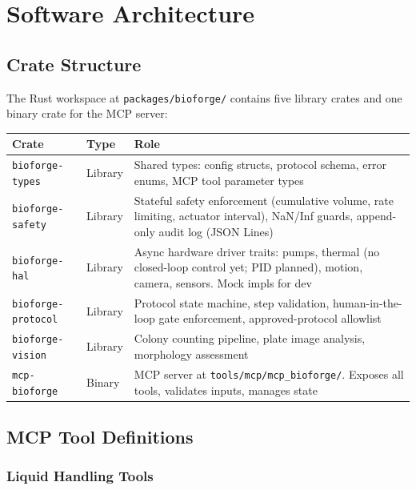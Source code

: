 \documentclass[11pt,letterpaper]{article}
\begin{document}
\section{Software Architecture}

\subsection{Crate Structure}

The Rust workspace at \texttt{packages/bioforge/} contains five library crates and one binary crate for the MCP server:

{\centering\begin{tabularx}{\textwidth}{L{3.6cm} L{1.5cm} Y}
\toprule
\textbf{Crate} & \textbf{Type} & \textbf{Role} \\
\midrule
\texttt{bioforge-types} & Library & Shared types: config structs, protocol schema, error enums, MCP tool parameter types \\
\texttt{bioforge-safety} & Library & Stateful safety enforcement (cumulative volume, rate limiting, actuator interval), NaN/Inf guards, append-only audit log (JSON Lines) \\
\texttt{bioforge-hal} & Library & Async hardware driver traits: pumps, thermal (no closed-loop control yet; PID planned), motion, camera, sensors. Mock impls for dev \\
\texttt{bioforge-protocol} & Library & Protocol state machine, step validation, human-in-the-loop gate enforcement, approved-protocol allowlist \\
\texttt{bioforge-vision} & Library & Colony counting pipeline, plate image analysis, morphology assessment \\
\texttt{mcp-bioforge} & Binary & MCP server at \texttt{tools/mcp/mcp\_bioforge/}. Exposes all tools, validates inputs, manages state \\
\bottomrule
\end{tabularx}\par}

\subsection{MCP Tool Definitions}

\subsubsection{Liquid Handling Tools}
\end{document}
